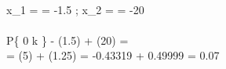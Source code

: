 \\ x_{1} =  = -1.5
\; \; ; \; \;
x_{2} =  = -20
\\
\\ P\left \{ 0 \leqslant k  \right \} \approx - \Phi (1.5) + \Phi(20) =
\\ = \Phi (5) + \Phi(1.25) = -0.43319 + 0.49999 = 0.07
